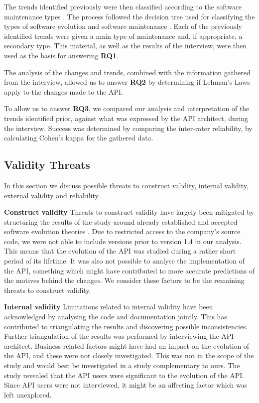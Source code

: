 \documentclass{sig-alternate}
\begin{document}
The trends identified previously were then classified according to the software maintenance types \cite{chapin2001types}. The process followed the decision tree used for classifying the types of software evolution and software maintenance \cite{chapin2001types}. Each of the previously identified trends were given a main type of maintenance and, if appropriate, a secondary type. This material, as well as the results of the interview, were then used as the basis for answering \textbf{RQ1}.

The analysis of the changes and trends, combined with the information gathered from the interview, allowed us to answer \textbf{RQ2} by determining if Lehman's Laws apply to the changes made to the API. 

To allow us to answer \textbf{RQ3}, we compared our analysis and interpretation of the trends identified prior, against what was expressed by the API architect, during the interview. Success was determined by comparing the inter-rater reliability, by calculating Cohen's kappa \cite{cohen1968weighted} for the gathered data. 





\subsection{Validity Threats} \label{validity_threats} %
In this section we discuss possible threats to construct validity, internal validity, external validity and reliability \cite{runeson2009guidelines}.

\smallskip \noindent
\textbf{Construct validity  } Threats to construct validity have largely been mitigated by structuring the results of the study around already established and accepted software evolution theories \cite{chapin2001types, lehman90sview}. Due to restricted access to the company's source code, we were not able to include versions prior to version 1.4 in our analysis. This means that the evolution of the API was studied during a rather short period of its lifetime. It was also not possible to analyse the implementation of the API, something which might have contributed to more accurate predictions of the motives behind the changes. We consider these factors to be the remaining threats to construct validity. 

\smallskip \noindent
\textbf{Internal validity  } Limitations related to internal validity have been acknowledged by analysing the code and documentation jointly. This has contributed to triangulating the results and discovering possible inconsistencies. Further triangulation of the results was performed by interviewing the API architect. Business-related factors might have had an impact on the evolution of the API, and these were not closely investigated. This was not in the scope of the study and would best be investigated in a study complementary to ours. The study revealed that the API users were significant to the evolution of the API. Since API users were not interviewed, it might be an affecting factor which was left unexplored. 
\end{document}
